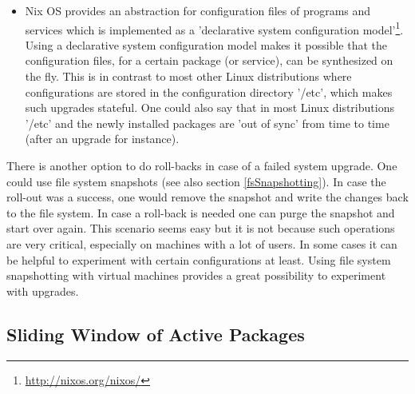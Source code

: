 \documentclass[a4paper,10pt]{article}
\begin{document}
\begin{itemize}
\begin{itemize}
\item Nix OS provides an abstraction for configuration files of programs and services which is implemented as a 'declarative system configuration model'\footnote{\url{http://nixos.org/nixos/}}. \\
Using a declarative system configuration model makes it possible that the configuration files, for a certain package (or service), can be synthesized on the fly. This is in contrast to most other Linux distributions where configurations are stored in the configuration directory '/etc', which makes such upgrades stateful. One could also say that in  most Linux distributions '/etc' and the newly installed packages are 'out of sync' from time to time (after an upgrade for instance).
\end{itemize}
There is another option to do roll-backs in case of a failed system upgrade. One could use file system snapshots (see also section \ref{fsSnapshotting}). In case the roll-out was a success, one would remove the snapshot and write the changes back to the file system. In case a roll-back is needed one can purge the snapshot and start over again. This scenario seems easy but it is not because such operations are very critical, especially on machines with a lot of users. In some cases it can be helpful to experiment with certain configurations at least. Using file system snapshotting with virtual machines provides a great possibility to experiment with upgrades.
\end{itemize}





\newpage
\subsection{Sliding Window of Active Packages}
\end{document}
